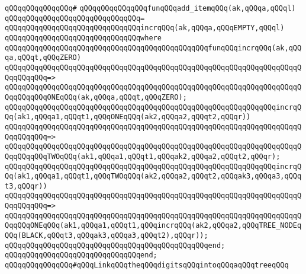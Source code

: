\verb|qQQqqQQqqQQqqQQq#|\newline
\verb|qQQqqQQqqQQqqQQqfunqQQqadd_itemqQQq(ak,qQQqa,qQQql)|\newline
\verb|qQQqqQQqqQQqqQQqqQQqqQQqqQQqqQQq=|\newline
\verb|qQQqqQQqqQQqqQQqqQQqqQQqqQQqqQQqincrqQQq(ak,qQQqa,qQQqEMPTY,qQQql)|\newline
\verb|qQQqqQQqqQQqqQQqqQQqqQQqqQQqqQQqwhere|\newline
\verb|qQQqqQQqqQQqqQQqqQQqqQQqqQQqqQQqqQQqqQQqqQQqqQQqfunqQQqincrqQQq(ak,qQQqa,qQQqt,qQQqZERO)|\newline
\verb|qQQqqQQqqQQqqQQqqQQqqQQqqQQqqQQqqQQqqQQqqQQqqQQqqQQqqQQqqQQqqQQqqQQqqQQqqQQqqQQq=>|\newline
\verb|qQQqqQQqqQQqqQQqqQQqqQQqqQQqqQQqqQQqqQQqqQQqqQQqqQQqqQQqqQQqqQQqqQQqqQQqqQQqqQQqONEqQQq(ak,qQQqa,qQQqt,qQQqZERO);|\newline
\newline
\verb|qQQqqQQqqQQqqQQqqQQqqQQqqQQqqQQqqQQqqQQqqQQqqQQqqQQqqQQqqQQqqQQqincrqQQq(ak1,qQQqa1,qQQqt1,qQQqONEqQQq(ak2,qQQqa2,qQQqt2,qQQqr))|\newline
\verb|qQQqqQQqqQQqqQQqqQQqqQQqqQQqqQQqqQQqqQQqqQQqqQQqqQQqqQQqqQQqqQQqqQQqqQQqqQQqqQQq=>|\newline
\verb|qQQqqQQqqQQqqQQqqQQqqQQqqQQqqQQqqQQqqQQqqQQqqQQqqQQqqQQqqQQqqQQqqQQqqQQqqQQqqQQqTWOqQQq(ak1,qQQqa1,qQQqt1,qQQqak2,qQQqa2,qQQqt2,qQQqr);|\newline
\newline
\verb|qQQqqQQqqQQqqQQqqQQqqQQqqQQqqQQqqQQqqQQqqQQqqQQqqQQqqQQqqQQqqQQqincrqQQq(ak1,qQQqa1,qQQqt1,qQQqTWOqQQq(ak2,qQQqa2,qQQqt2,qQQqak3,qQQqa3,qQQqt3,qQQqr))|\newline
\verb|qQQqqQQqqQQqqQQqqQQqqQQqqQQqqQQqqQQqqQQqqQQqqQQqqQQqqQQqqQQqqQQqqQQqqQQqqQQqqQQq=>|\newline
\verb|qQQqqQQqqQQqqQQqqQQqqQQqqQQqqQQqqQQqqQQqqQQqqQQqqQQqqQQqqQQqqQQqqQQqqQQqqQQqONEqQQq(ak1,qQQqa1,qQQqt1,qQQqincrqQQq(ak2,qQQqa2,qQQqTREE_NODEqQQq(BLACK,qQQqt3,qQQqak3,qQQqa3,qQQqt2),qQQqr));|\newline
\verb|qQQqqQQqqQQqqQQqqQQqqQQqqQQqqQQqqQQqqQQqqQQqqQQqend;|\newline
\verb|qQQqqQQqqQQqqQQqqQQqqQQqqQQqqQQqend;|\newline
\newline
\newline
\verb|qQQqqQQqqQQqqQQq#qQQqLinkqQQqtheqQQqdigitsqQQqintoqQQqaqQQqtreeqQQq|\newline
\newline
